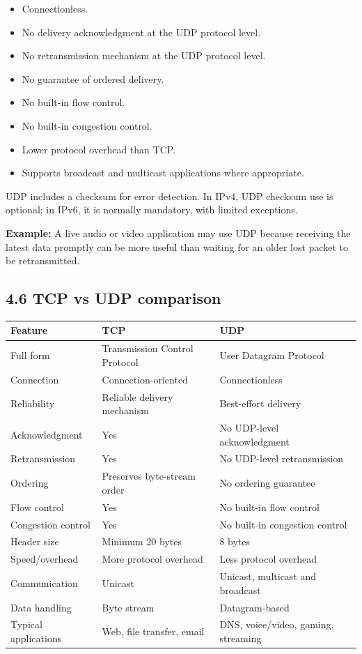 \begin{itemize}
    \item Connectionless.
    \item No delivery acknowledgment at the UDP protocol level.
    \item No retransmission mechanism at the UDP protocol level.
    \item No guarantee of ordered delivery.
    \item No built-in flow control.
    \item No built-in congestion control.
    \item Lower protocol overhead than TCP.
    \item Supports broadcast and multicast applications where appropriate.
\end{itemize}

UDP includes a checksum for error detection. In IPv4, UDP checksum use is optional; in IPv6, it is normally mandatory, with limited exceptions.

\textbf{Example:} A live audio or video application may use UDP because receiving the latest data promptly can be more useful than waiting for an older lost packet to be retransmitted.

\subsection{4.6 TCP vs UDP comparison}

\begin{table}[htbp]
\centering
\begin{tabularx}{\textwidth}{p{4.2cm} X X}
\toprule
\textbf{Feature} & \textbf{TCP} & \textbf{UDP} \\
\midrule
Full form & Transmission Control Protocol & User Datagram Protocol \\
Connection & Connection-oriented & Connectionless \\
Reliability & Reliable delivery mechanism & Best-effort delivery \\
Acknowledgment & Yes & No UDP-level acknowledgment \\
Retransmission & Yes & No UDP-level retransmission \\
Ordering & Preserves byte-stream order & No ordering guarantee \\
Flow control & Yes & No built-in flow control \\
Congestion control & Yes & No built-in congestion control \\
Header size & Minimum 20 bytes & 8 bytes \\
Speed/overhead & More protocol overhead & Less protocol overhead \\
Communication & Unicast & Unicast, multicast and broadcast \\
Data handling & Byte stream & Datagram-based \\
Typical applications & Web, file transfer, email & DNS, voice/video, gaming, streaming \\
\bottomrule
\end{tabularx}
\end{table}

